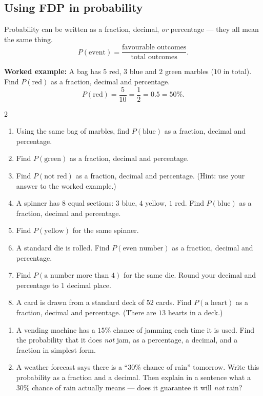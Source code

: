 \documentclass[11pt]{article}
\newcommand{\ans}{\hrulefill}
\newcommand{\anshere}{\par\vspace{0.4em}\noindent\ans\par\vspace{0.4em}}
\begin{document}
\subsection*{Using FDP in probability}
\noindent Probability can be written as a fraction, decimal, \emph{or} percentage --- they all
mean the same thing.
\[
  P(\text{event}) = \frac{\text{favourable outcomes}}{\text{total outcomes}}.
\]

\vspace{0.3em}
\noindent\textbf{Worked example:} A bag has $5$ red, $3$ blue and $2$ green marbles ($10$ in
total). Find $P(\text{red})$ as a fraction, decimal and percentage.
\[
  P(\text{red}) = \frac{5}{10} = \frac{1}{2} = 0.5 = 50\%.
\]

\begin{multicols}{2}
\begin{enumerate}[label=(\alph*)]
  \item Using the same bag of marbles, find $P(\text{blue})$ as a fraction, decimal and
    percentage.
  \anshere
  \item Find $P(\text{green})$ as a fraction, decimal and percentage.
  \anshere
  \item Find $P(\text{not red})$ as a fraction, decimal and percentage. (Hint: use your answer
    to the worked example.)
  \anshere
  \item A spinner has $8$ equal sections: $3$ blue, $4$ yellow, $1$ red. Find $P(\text{blue})$
    as a fraction, decimal and percentage.
  \anshere
  \item Find $P(\text{yellow})$ for the same spinner.
  \anshere
  \item A standard die is rolled. Find $P(\text{even number})$ as a fraction, decimal and
    percentage.
  \anshere
  \item Find $P(\text{a number more than } 4)$ for the same die. Round your decimal and
    percentage to $1$ decimal place.
  \anshere
  \item A card is drawn from a standard deck of $52$ cards. Find $P(\text{a heart})$ as a
    fraction, decimal and percentage. (There are $13$ hearts in a deck.)
  \anshere
\end{enumerate}
\end{multicols}

\vspace{0.3em}
\begin{enumerate}[label=(\alph*), resume]
  \item A vending machine has a $15\%$ chance of jamming each time it is used. Find the
    probability that it does \emph{not} jam, as a percentage, a decimal, and a fraction in
    simplest form.
  \anshere
  \item A weather forecast says there is a ``$30\%$ chance of rain'' tomorrow. Write this
    probability as a fraction and a decimal. Then explain in a sentence what a $30\%$ chance of
    rain actually means --- does it guarantee it will \emph{not} rain?
  \anshere
\end{enumerate}
\end{document}
